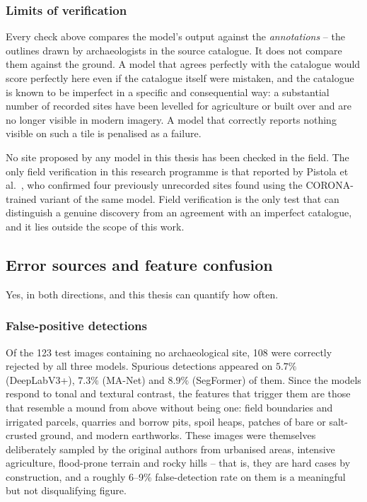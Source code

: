 \subsubsection{Limits of verification}
Every check above compares the model's output against the \emph{annotations} --
the outlines drawn by archaeologists in the source catalogue. It does not
compare them against the ground. A model that agrees perfectly with the
catalogue would score perfectly here even if the catalogue itself were
mistaken, and the catalogue is known to be imperfect in a specific and
consequential way: a substantial number of recorded sites have been levelled
for agriculture or built over and are no longer visible in modern imagery. A
model that correctly reports nothing visible on such a tile is penalised as a
failure.

No site proposed by any model in this thesis has been checked in the field. The
only field verification in this research programme is that reported by Pistola
et al.~\cite{Pistola25}, who confirmed four previously unrecorded sites found
using the CORONA-trained variant of the same model. Field verification is the
only test that can distinguish a genuine discovery from an agreement with an
imperfect catalogue, and it lies outside the scope of this work.

\subsection{Error sources and feature confusion}
\label{sec:arch-confusion}

Yes, in both directions, and this thesis can quantify how often.

\subsubsection{False-positive detections}
Of the 123 test images containing no archaeological site, 108 were correctly
rejected by all three models. Spurious detections appeared on $5.7\%$
(DeepLabV3+), $7.3\%$ (MA-Net) and $8.9\%$ (SegFormer) of them. Since the
models respond to tonal and textural contrast, the features that trigger them
are those that resemble a mound from above without being one: field boundaries
and irrigated parcels, quarries and borrow pits, spoil heaps, patches of bare
or salt-crusted ground, and modern earthworks. These images were themselves
deliberately sampled by the original authors from urbanised areas, intensive
agriculture, flood-prone terrain and rocky hills -- that is, they are hard
cases by construction, and a roughly 6--9\% false-detection rate on them is a
meaningful but not disqualifying figure.

